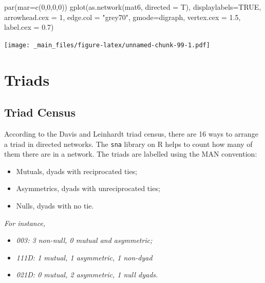 \documentclass[
  notitlepage,
  onecolumn,
  openany]{book}
\newenvironment{Shaded}{\begin{snugshade}}{\end{snugshade}}
\newcommand{\AttributeTok}[1]{\textcolor[rgb]{0.77,0.63,0.00}{#1}}
\newcommand{\ConstantTok}[1]{\textcolor[rgb]{0.00,0.00,0.00}{#1}}
\newcommand{\DecValTok}[1]{\textcolor[rgb]{0.00,0.00,0.81}{#1}}
\newcommand{\FloatTok}[1]{\textcolor[rgb]{0.00,0.00,0.81}{#1}}
\newcommand{\FunctionTok}[1]{\textcolor[rgb]{0.00,0.00,0.00}{#1}}
\newcommand{\NormalTok}[1]{#1}
\newcommand{\StringTok}[1]{\textcolor[rgb]{0.31,0.60,0.02}{#1}}
\providecommand{\tightlist}{%
  \setlength{\itemsep}{0pt}\setlength{\parskip}{0pt}}
\begin{document}
\begin{Shaded}
\begin{Highlighting}[]
\FunctionTok{par}\NormalTok{(}\AttributeTok{mar=}\FunctionTok{c}\NormalTok{(}\DecValTok{0}\NormalTok{,}\DecValTok{0}\NormalTok{,}\DecValTok{0}\NormalTok{,}\DecValTok{0}\NormalTok{))}
\FunctionTok{gplot}\NormalTok{(}\FunctionTok{as.network}\NormalTok{(mat6, }\AttributeTok{directed =}\NormalTok{  T),}
     \AttributeTok{displaylabels=}\ConstantTok{TRUE}\NormalTok{, }
     \AttributeTok{arrowhead.cex =} \DecValTok{1}\NormalTok{, }
     \AttributeTok{edge.col =} \StringTok{"grey70"}\NormalTok{,}
     \AttributeTok{gmode=}\StringTok{\textquotesingle{}digraph\textquotesingle{}}\NormalTok{,}
     \AttributeTok{vertex.cex =} \FloatTok{1.5}\NormalTok{,}
     \AttributeTok{label.cex =} \FloatTok{0.7}\NormalTok{)}
\end{Highlighting}
\end{Shaded}

\texttt{[image: \_main\_files/figure-latex/unnamed-chunk-99-1.pdf]}

\hypertarget{triads}{%
\section{Triads}\label{triads}}

\hypertarget{triad-census}{%
\subsection{Triad Census}\label{triad-census}}

According to the Davis and Leinhardt triad census, there are 16 ways to arrange a triad in directed networks. The \texttt{sna} library on R helps to count how many of them there are in a network. The triads are labelled using the MAN convention:

\begin{itemize}
\tightlist
\item
  Mutuals, dyads with reciprocated ties;
\item
  Asymmetrics, dyads with unreciprocated ties;
\item
  Nulls, dyads with no tie.
\end{itemize}

\emph{For instance,}

\begin{itemize}
\tightlist
\item
  \emph{003: 3 non-null, 0 mutual and asymmetric;}
\item
  \emph{111D: 1 mutual, 1 asymmetric, 1 non-dyad}
\item
  \emph{021D: 0 mutual, 2 asymmetric, 1 null dyads.}
\end{itemize}
\end{document}
